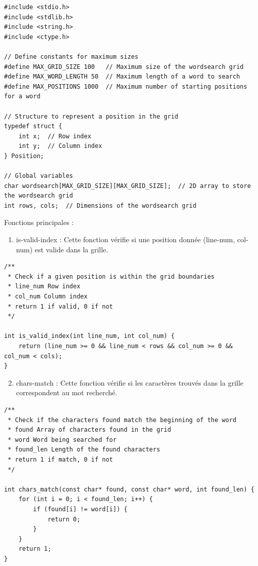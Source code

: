 
\begin{lstlisting}[style=CStyle]
#include <stdio.h>
#include <stdlib.h>
#include <string.h>
#include <ctype.h>

// Define constants for maximum sizes
#define MAX_GRID_SIZE 100   // Maximum size of the wordsearch grid
#define MAX_WORD_LENGTH 50  // Maximum length of a word to search
#define MAX_POSITIONS 1000  // Maximum number of starting positions for a word

// Structure to represent a position in the grid
typedef struct {
    int x;  // Row index
    int y;  // Column index
} Position;

// Global variables
char wordsearch[MAX_GRID_SIZE][MAX_GRID_SIZE];  // 2D array to store the wordsearch grid
int rows, cols;  // Dimensions of the wordsearch grid
\end{lstlisting}
\newpage
Fonctions principales :

\begin{enumerate}
  \item{is-valid-index : Cette fonction vérifie si une position donnée (line-num, col-num) est valide dans la grille.}
\end{enumerate}

\begin{lstlisting}[style=CStyle]
/**
 * Check if a given position is within the grid boundaries
 * line_num Row index
 * col_num Column index
 * return 1 if valid, 0 if not
 */
 
int is_valid_index(int line_num, int col_num) {
	return (line_num >= 0 && line_num < rows && col_num >= 0 && col_num < cols);
}
\end{lstlisting}

\begin{enumerate}[resume]
  \setcounter{enumi}{1}
  \item chars-match : Cette fonction vérifie si les caractères trouvés dans la grille correspondent au mot recherché.
\end{enumerate}

\begin{lstlisting}[style=CStyle]
/**
 * Check if the characters found match the beginning of the word
 * found Array of characters found in the grid
 * word Word being searched for
 * found_len Length of the found characters
 * return 1 if match, 0 if not
 */

int chars_match(const char* found, const char* word, int found_len) {
	for (int i = 0; i < found_len; i++) {
		if (found[i] != word[i]) {
			return 0;
		}
	}
	return 1;
}
\end{lstlisting}

